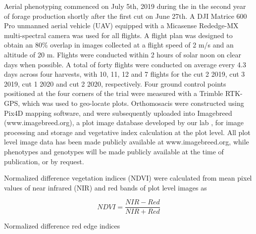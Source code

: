 \documentclass[12pt, letterpaper]{article}
\begin{document}
Aerial phenotyping commenced on July 5th, 2019 during the in the second year of forage production shortly after the first cut on June 27th. A DJI Matrice 600 Pro unmanned aerial vehicle (UAV) equipped with a Micasense Rededge-MX multi-spectral camera was used for all flights. A flight plan was designed to obtain an 80\% overlap in images collected at a flight speed of 2 m/s and an altitude of 20 m. Flights were conducted within 2 hours of solar noon on clear days when possible. A total of forty flights were conducted on average every 4.3 days across four harvests, with 10, 11, 12 and 7 flights for the cut 2 2019, cut 3 2019, cut 1 2020 and cut 2 2020, respectively. Four ground control points positioned at the four corners of the trial were measured with a Trimble RTK-GPS, which was used to geo-locate plots. Orthomosacis were constructed using Pix4D mapping software, and were subsequently uploaded into Imagebreed (www.imagebreed.org), a plot image database developed by our lab \parencite{morales2020}, for image processing and storage and vegetative index calculation at the plot level. All plot level image data has been made publicly available at www.imagebreed.org, while phenotypes and genotypes will be made publicly available at the time of publication, or by request.


Normalized difference vegetation indices (NDVI) were calculated from mean pixel values of near infrared (NIR) and red bands of plot level images as

\begin{equation}
	NDVI = \frac{NIR - Red}{NIR + Red}
\end{equation}

Normalized difference red edge indices

\end{document}
